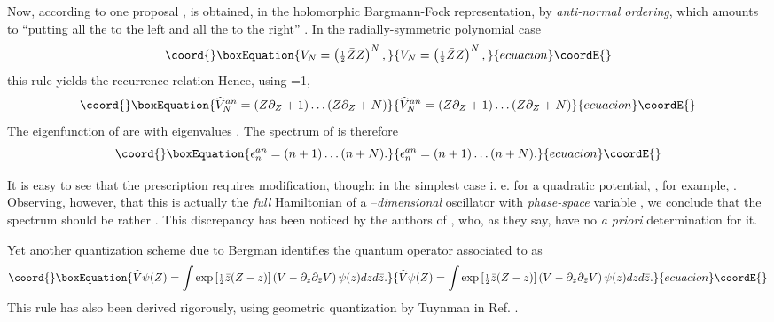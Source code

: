 \documentclass[a4paper,11pt]{article}
\providecommand{\half}{{\scriptstyle{\frac{1}{2}}}}
\def\p{{\partial}}
\begin{document}
Now, according to one proposal \cite{DJT, DuJa, GJ},
\coordHE{} is obtained, in the holomorphic Bargmann-Fock representation,
by {\it anti-normal ordering}, which amounts to ``putting all the
\coordHE{} to
the left and all the \coordHE{} to the right'' \cite{GJ, DuJa}.
In the radially-symmetric polynomial case
\begin{equation}\coord{}\boxEquation{
     V_{N}=\left(\half{\bar{Z}Z}\right)^N,
    \label{Npot}
}{
     V_{N}=\left(\half{\bar{Z}Z}\right)^N,
    }{ecuacion}\coordE{}\end{equation}
this rule yields the recurrence relation
\myHighlight{$
\widehat{V}^{an}_{N}=\widehat{V}^{an}_{N-1}(Z\p_{Z}+N).
$}\coordHE{}
Hence, using  \coordHE{}=1,
\begin{equation}\coord{}\boxEquation{
     \widehat{V}^{an}_{N}=(Z\p_{Z}+1)\dots(Z\p_{Z}+N)
     \label{Van}
}{
     \widehat{V}^{an}_{N}=(Z\p_{Z}+1)\dots(Z\p_{Z}+N)
     }{ecuacion}\coordE{}\end{equation}
The eigenfunction of \coordHE{}
  are \coordHE{} with eigenvalues \coordHE{}.
  The spectrum of \coordHE{} is therefore
\begin{equation}\coord{}\boxEquation{
     \epsilon_{n}^{an}=(n+1)\dots(n+N).
     \label{Jopspect}
}{
     \epsilon_{n}^{an}=(n+1)\dots(n+N).
     }{ecuacion}\coordE{}\end{equation}


It is easy to see that
the prescription requires modification, though: in the simplest case
\coordHE{} i. e. for a quadratic potential,
\myHighlight{$V=\half Z\bar{Z}$}\coordHE{}, for example, \coordHE{}.
  Observing, however, that this \coordHE{} is actually the
  {\it full} Hamiltonian of
  a \coordHE{}--{\it dimensional} oscillator with {\it phase-space} variable \coordHE{},
we conclude that the spectrum should be rather \coordHE{}.
This discrepancy has been noticed by the authors of \cite{DJT}, who,
as they say, have no {\it a priori} determination for it.

Yet another quantization scheme
due to Bergman  \cite{Bergman} identifies
the quantum operator associated to \coordHE{} as
\begin{equation}\coord{}\boxEquation{
     \widehat{V}\psi(Z)=
     \int\exp\left[\half\bar{z}(Z-z)\right]
     \left(V-\p_{z}\p_{\bar{z}}V\right)\psi(z)dzd\bar{z}.
     \label{Bergmankernel}
}{
     \widehat{V}\psi(Z)=
     \int\exp\left[\half\bar{z}(Z-z)\right]
     \left(V-\p_{z}\p_{\bar{z}}V\right)\psi(z)dzd\bar{z}.
     }{ecuacion}\coordE{}\end{equation}
This rule has also been derived rigorously, using geometric
quantization by Tuynman in Ref. \cite{Bergman}.
\end{document}
